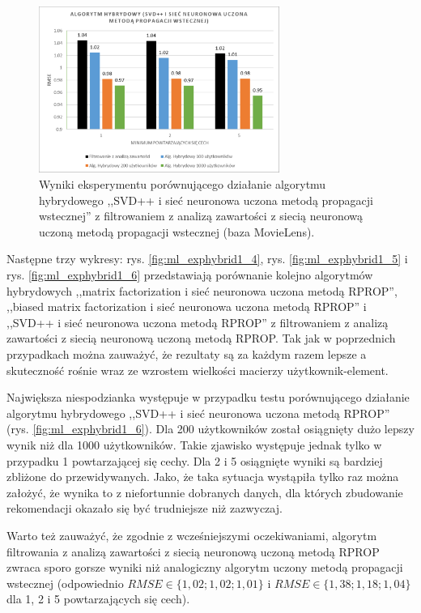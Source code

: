 \documentclass[twoside]{iisthesis}
\begin{document}
		\begin{figure}
			\centering
			\includegraphics[width=0.7\textwidth]{ml_exphybrid1_3}			
			\caption{Wyniki eksperymentu porównującego działanie algorytmu hybrydowego ,,SVD++ i sieć neuronowa uczona metodą propagacji wstecznej'' z filtrowaniem z analizą zawartości z siecią neuronową uczoną metodą propagacji wstecznej (baza MovieLens).}
			\label{fig:ml_exphybrid1_3}
		\end{figure}
		
		Następne trzy wykresy: rys. \ref{fig:ml_exphybrid1_4}, rys. \ref{fig:ml_exphybrid1_5} i rys. \ref{fig:ml_exphybrid1_6} przedstawiają porównanie kolejno algorytmów hybrydowych ,,matrix factorization i sieć neuronowa uczona metodą RPROP'', ,,biased matrix factorization i sieć neuronowa uczona metodą RPROP'' i ,,SVD++ i sieć neuronowa uczona metodą RPROP'' z filtrowaniem z analizą zawartości z siecią neuronową uczoną metodą RPROP. Tak jak w poprzednich przypadkach można zauważyć, że rezultaty są za każdym razem lepsze a skuteczność rośnie wraz ze wzrostem wielkości macierzy użytkownik-element.
		
		Największa niespodzianka występuje w przypadku testu porównującego działanie algorytmu hybrydowego ,,SVD++ i sieć neuronowa uczona metodą RPROP'' (rys. \ref{fig:ml_exphybrid1_6}). Dla 200 użytkowników został osiągnięty dużo lepszy wynik niż dla 1000 użytkowników. Takie zjawisko występuje jednak tylko w przypadku 1 powtarzającej się cechy. Dla 2 i 5 osiągnięte wyniki są bardziej zbliżone do przewidywanych. Jako, że taka sytuacja wystąpiła tylko raz można założyć, że wynika to z niefortunnie dobranych danych, dla których zbudowanie rekomendacji okazało się być trudniejsze niż zazwyczaj. 
		
		Warto też zauważyć, że zgodnie z wcześniejszymi oczekiwaniami, algorytm filtrowania z analizą zawartości z siecią neuronową uczoną metodą RPROP zwraca sporo gorsze wyniki niż analogiczny algorytm uczony metodą propagacji wstecznej (odpowiednio $RMSE \in \{1,02; 1,02; 1,01\}$ i $RMSE \in \{1,38; 1,18; 1,04\}$ dla 1, 2 i 5 powtarzających się cech). 
		
\end{document}

